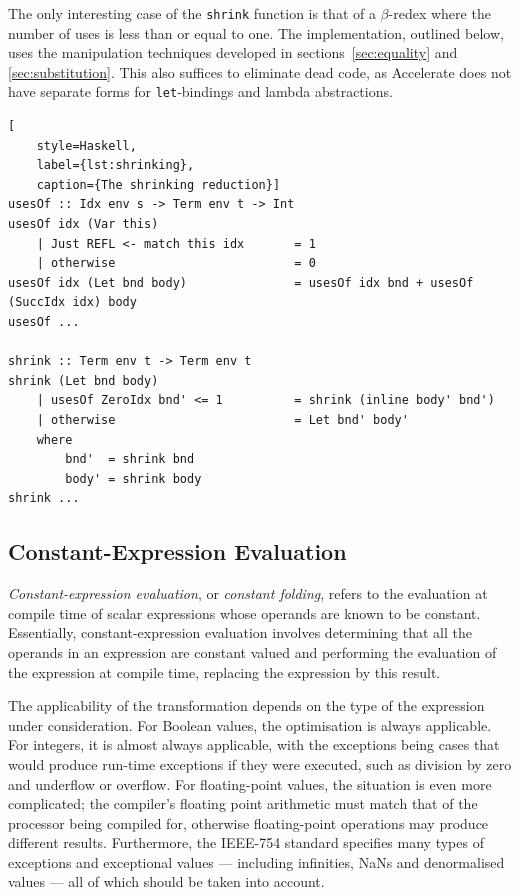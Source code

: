 The only interesting case of the \texttt{shrink} function is that of a
$\beta$-redex where the number of uses is less than or equal to one. The
implementation, outlined below, uses the  manipulation
techniques developed in sections~\ref{sec:equality} and \ref{sec:substitution}.
This also suffices to eliminate dead code, as Accelerate does not have separate
forms for \texttt{let}-bindings and lambda abstractions.
%
\begin{lstlisting}[
    style=Haskell,
    label={lst:shrinking},
    caption={The shrinking reduction}]
usesOf :: Idx env s -> Term env t -> Int
usesOf idx (Var this)
    | Just REFL <- match this idx       = 1
    | otherwise                         = 0
usesOf idx (Let bnd body)               = usesOf idx bnd + usesOf (SuccIdx idx) body
usesOf ...

shrink :: Term env t -> Term env t
shrink (Let bnd body)
    | usesOf ZeroIdx bnd' <= 1          = shrink (inline body' bnd')
    | otherwise                         = Let bnd' body'
    where
        bnd'  = shrink bnd
        body' = shrink body
shrink ...
\end{lstlisting}


\subsection{Constant-Expression Evaluation}

\emph{Constant-expression evaluation}, or \emph{constant folding}, refers to the
evaluation at compile time of scalar expressions whose operands are known to be
constant. Essentially, constant-expression evaluation involves determining that
all the operands in an expression are constant valued and performing the
evaluation of the expression at compile time, replacing the expression by this
result.

The applicability of the transformation depends on the type of the expression
under consideration. For Boolean values, the optimisation is always applicable.
For integers, it is almost always applicable, with the exceptions being cases
that would produce run-time exceptions if they were executed, such as division
by zero and underflow or overflow. For floating-point values, the situation is
even more complicated; the compiler's floating point arithmetic must match that
of the processor being compiled for, otherwise floating-point operations may
produce different results. Furthermore, the IEEE-754 standard specifies many
types of exceptions and exceptional values --- including infinities, NaNs and
denormalised values --- all of which should be taken into account.


